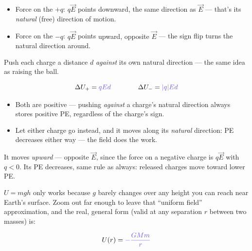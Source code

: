 \documentclass[12pt]{article}
\newcommand{\ANS}[1]{\textcolor{accent}{#1}}
\begin{document}
\begin{itemize}[itemsep=9pt,parsep=4pt,topsep=4pt]
\item Force on the $+q$: $q\vec E$ points \ANS{downward, the same direction
as $\vec E$} --- that's its \emph{natural} (free) direction of motion.
\item Force on the $-q$: $q\vec E$ points \ANS{upward, opposite $\vec E$} ---
the sign flip turns the natural direction around.
\end{itemize}

Push each charge a distance $d$ \emph{against} its own natural direction ---
the same idea as raising the ball.

\[
\Delta U_+ = \ANS{qEd} \qquad\qquad \Delta U_- = \ANS{|q|Ed}
\]

\begin{itemize}[itemsep=9pt,parsep=4pt,topsep=4pt]
\item Both are \ANS{positive} --- pushing \emph{against} a charge's natural
direction always stores positive PE, regardless of the charge's sign.
\item Let either charge go instead, and it moves along its \emph{natural}
direction: PE \ANS{decreases} either way --- the field does the work.
\end{itemize}


{\small\color{accent} It moves \emph{upward} --- opposite $\vec E$, since the
force on a negative charge is $q\vec E$ with $q<0$. Its PE decreases, same
rule as always: released charges move toward lower PE.}


$U=mgh$ only works because $g$ barely changes over any height you can
reach near Earth's surface. Zoom out far enough to leave that ``uniform
field'' approximation, and the real, general form (valid at any separation
$r$ between two masses) is:

\[
U(r) = \ANS{-\dfrac{GMm}{r}}
\]

\begin{center}
\end{center}
\end{document}
